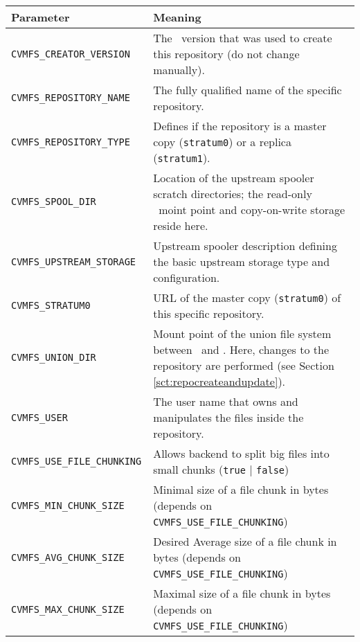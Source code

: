 	\begin{longtable}{lX}
		\toprule
		{\bf\centering Parameter} 			& {\bf\centering Meaning}\\
		\midrule
		\tt CVMFS\_CREATOR\_VERSION			& The \cvmfs\ version that was used to create this repository (do not change manually).\\
		\tt CVMFS\_REPOSITORY\_NAME			& The fully qualified name of the specific repository.\\
		\tt CVMFS\_REPOSITORY\_TYPE			& Defines if the repository is a master copy (\texttt{stratum0}) or a replica (\texttt{stratum1}).\\
		\tt CVMFS\_SPOOL\_DIR					& Location of the upstream spooler scratch directories; the read-only \cvmfs\ moint point and copy-on-write storage reside here.\\
		\tt CVMFS\_UPSTREAM\_STORAGE			& Upstream spooler description defining the basic upstream storage type and configuration.\\
		\tt CVMFS\_STRATUM0					& URL of the master copy (\texttt{stratum0}) of this specific repository.\\
		\tt CVMFS\_UNION\_DIR					& Mount point of the union file system between \cvmfs\ and \aufs. Here, changes to the repository are performed (see Section \ref{sct:repocreateandupdate}).\\
		\tt CVMFS\_USER						& The user name that owns and manipulates the files inside the repository.\\
		\tt CVMFS\_USE\_FILE\_CHUNKING		& Allows backend to split big files into small chunks (\texttt{true} | \texttt{false})\\
		\tt CVMFS\_MIN\_CHUNK\_SIZE			& Minimal size of a file chunk in bytes \newline (depends on \texttt{CVMFS\_USE\_FILE\_CHUNKING})\\
		\tt CVMFS\_AVG\_CHUNK\_SIZE			& Desired Average size of a file chunk in bytes \newline (depends on \texttt{CVMFS\_USE\_FILE\_CHUNKING})\\
		\tt CVMFS\_MAX\_CHUNK\_SIZE			& Maximal size of a file chunk in bytes \newline (depends on \texttt{CVMFS\_USE\_FILE\_CHUNKING})\\
		\bottomrule
	\end{longtable}

